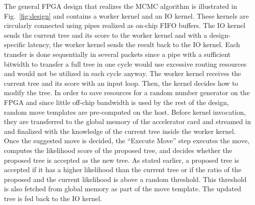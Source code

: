 The general \ac{FPGA} design that realizes the \ac{MCMC} algorithm is illustrated in Fig.~\ref{fig:design} and contains a worker kernel and an IO kernel. These kernels are circularly connected using pipes realized as on-chip FIFO buffers. The IO kernel sends the current tree and its score to the worker kernel and with a design-specific latency, the worker kernel sends the result back to the IO kernel. Each transfer is done sequentially in several packets since a pipe with a sufficient bitwidth to transfer a full tree in one cycle would use excessive routing resources and would not be utilized in each cycle anyway. The worker kernel receives the current tree and its score with an input loop. Then, the kernel decides how to modify the tree. In order to save resources for a random number generator on the FPGA and since little off-chip bandwidth is used by the rest of the design, random move templates are pre-computed on the host. Before kernel invocation, they are transferred to the global memory of the accelerator card and streamed in and finalized with the knowledge of the current tree inside the worker kernel.
Once the suggested move is decided, the ``Execute Move'' step executes the move, computes the likelihood score of the proposed tree, and decides whether the proposed tree is accepted as the new tree. As stated earlier, a proposed tree is accepted if it has a higher likelihood than the current tree or if the ratio of the proposed and the current likelihood is above a random threshold. This threshold is also fetched from global memory as part of the move template. The updated tree is fed back to the IO kernel. 

